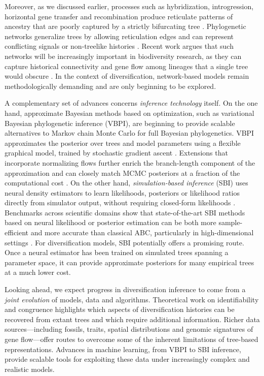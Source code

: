 Moreover, as we discussed earlier, processes such as hybridization, introgression, horizontal gene transfer and recombination produce reticulate patterns of ancestry that are poorly captured by a strictly bifurcating tree \citep{huson_application_2006}. Phylogenetic networks generalize trees by allowing reticulation edges and can represent conflicting signals or non-treelike histories \citep{huson_application_2006}. Recent work argues that such networks will be increasingly important in biodiversity research, as they can capture historical connectivity and gene flow among lineages that a single tree would obscure \citep{kong_phylogenetic_2025}. In the context of diversification, network-based models remain methodologically demanding and are only beginning to be explored.

A complementary set of advances concerns \emph{inference technology} itself. On the one hand, approximate Bayesian methods based on optimization, such as variational Bayesian phylogenetic inference (VBPI), are beginning to provide scalable alternatives to Markov chain Monte Carlo for full Bayesian phylogenetics. VBPI approximates the posterior over trees and model parameters using a flexible graphical model, trained by stochastic gradient ascent \citep{zhang_variational_2024}. Extensions that incorporate normalizing flows further enrich the branch-length component of the approximation and can closely match MCMC posteriors at a fraction of the computational cost \citep{zhang_variational_2024}. On the other hand, \emph{simulation-based inference} (SBI) uses neural density estimators to learn likelihoods, posteriors or likelihood ratios directly from simulator output, without requiring closed-form likelihoods \citep{cranmer_frontier_2020}. Benchmarks across scientific domains show that state-of-the-art SBI methods based on neural likelihood or posterior estimation can be both more sample-efficient and more accurate than classical ABC, particularly in high-dimensional settings \citep{lueckmann_benchmarking_2021}. For diversification models, SBI potentially offers a promising route. Once a neural estimator has been trained on simulated trees spanning a parameter space, it can provide approximate posteriors for many empirical trees at a much lower cost.

Looking ahead, we expect progress in diversification inference to come from a \emph{joint evolution} of models, data and algorithms. Theoretical work on identifiability and congruence highlights which aspects of diversification histories can be recovered from extant trees and which require additional information. Richer data sources---including fossils, traits, spatial distributions and genomic signatures of gene flow---offer routes to overcome some of the inherent limitations of tree-based representations. Advances in machine learning, from VBPI to SBI inference, provide scalable tools for exploiting these data under increasingly complex and realistic models. 

